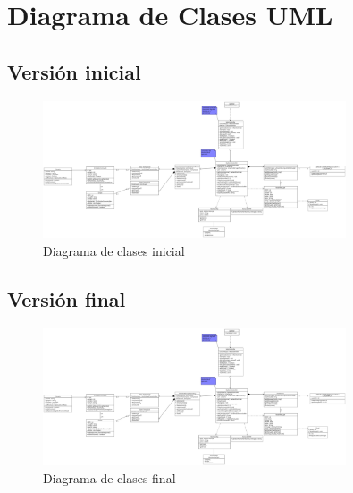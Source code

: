 \chapter{Diagrama de Clases UML}

\section{Versión inicial}
\begin{figure}[H]
    \centering
    \includegraphics[width=0.8\textwidth]{images/AppChat_Domino.png}
    \caption{Diagrama de clases inicial}
\end{figure}

\section{Versión final}
\begin{figure}[H]
    \centering
    \includegraphics[width=0.8\textwidth]{images/AppChat_Domino.png}
    \caption{Diagrama de clases final}
\end{figure}
